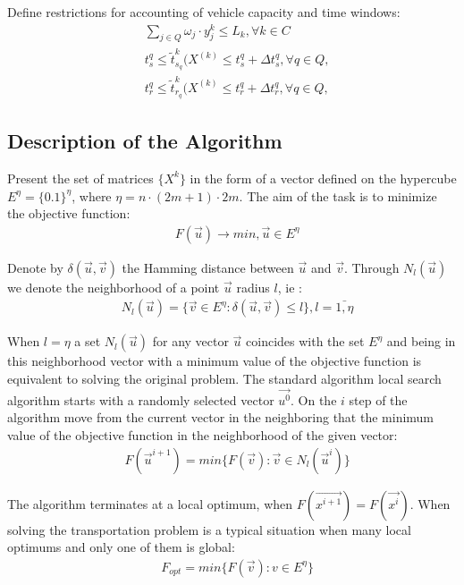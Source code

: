 \documentclass[]{TAACpaper}
\begin{document}
Define restrictions for accounting of vehicle capacity and time windows:
\begin{align} 
& \sum_{j\in{Q}} \omega_j \cdot y_{j}^{k} \leq L_k, \forall{k}\in{C}\\
& t_{s}^{q} \leq \tilde{t}^k_{s_q}(X^{(k)} \leq t_{s}^{q}+ \Delta{t_{s}^{q}}, \forall q \in Q, \label{tws_cond} \\
& t_{r}^{q} \leq \tilde{t}^k_{r_q}(X^{(k)} \leq t_{r}^{q}+ \Delta{t_{r}^{q}}, \forall q \in Q, \label{twr_cond}
\end{align}



\subsection{Description of the Algorithm}
Present the set of matrices $\{X^k\}$ in the form of a vector defined on the hypercube $E^\eta=\{0.1\}^\eta$, where $\eta=n\cdot(2m+1)\cdot 2m$. The aim of the task is to minimize the objective function:
\begin{align} 
& F(\vec{u})\to min,\vec{u}\in E^{\eta}
\end{align}	

Denote by $\delta(\vec{u},\vec{v})$ the Hamming distance between $\vec{u}$ and $\vec{v}$. Through $N_l(\vec{u})$ we denote the neighborhood of a point $\vec{u}$ radius $l$, ie \cite{vrp_shafeyev}:
\begin{align} 
& N_l(\vec{u})=\{\vec{v} \in E^{\eta}:\delta(\vec{u},\vec{v})\le l \}, l=\bar{1,\eta}
\end{align}	

When $l=\eta$ a set $ N_l(\vec{u})$ for any vector $\vec{u}$ coincides with the set $E^{\eta}$ and being in this neighborhood vector with a minimum value of the objective function is equivalent to solving the original problem. The standard algorithm local search algorithm starts with a randomly selected vector $\vec{u^0}$.
On the $i$ step of the algorithm move from the current vector in the neighboring that the minimum value of the objective function in the neighborhood of the given vector:
\begin{align} 
& F(\vec{u}^{i+1})=min\{F(\vec{v}):\vec{v} \in N_l(\vec{u}^i)\}
\end{align}	

The algorithm terminates at a local optimum, when $F(\vec{x^{i+1}})=F(\vec{x^i})$. When solving the transportation problem is a typical situation when many local optimums and only one of them is global:
\begin{align} 
& F_{opt}=min\{F(\vec{v}):v \in E^{\eta}\}
\end{align}	
\end{document}
